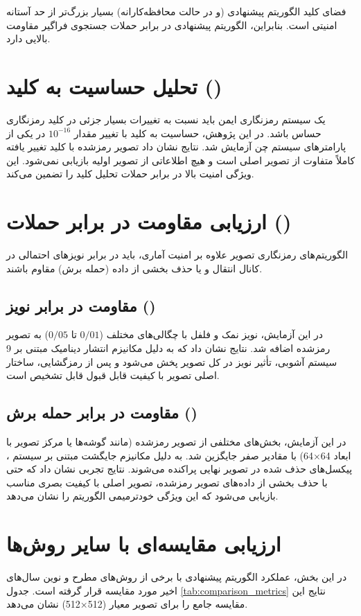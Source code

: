 فضای کلید الگوریتم پیشنهادی (و در حالت محافظه‌کارانه) بسیار بزرگ‌تر از حد آستانه امنیتی است. بنابراین، الگوریتم پیشنهادی در برابر حملات جستجوی فراگیر مقاومت بالایی دارد.

\section{تحلیل حساسیت به کلید ()}
یک سیستم رمزنگاری ایمن باید نسبت به تغییرات بسیار جزئی در کلید رمزنگاری حساس باشد. در این پژوهش، حساسیت به کلید با تغییر مقدار $10^{-16}$ در یکی از پارامترهای سیستم چن آزمایش شد. نتایج نشان داد تصویر رمزشده با کلید تغییر یافته کاملاً متفاوت از تصویر اصلی است و هیچ اطلاعاتی از تصویر اولیه بازیابی نمی‌شود. این ویژگی امنیت بالا در برابر حملات تحلیل کلید را تضمین می‌کند.

\section{ارزیابی مقاومت در برابر حملات ()}
الگوریتم‌های رمزنگاری تصویر علاوه بر امنیت آماری، باید در برابر نویزهای احتمالی در کانال انتقال و یا حذف بخشی از داده (حمله برش) مقاوم باشند.

\subsection{مقاومت در برابر نویز ()}
در این آزمایش، نویز نمک و فلفل با چگالی‌های مختلف ($0/01$ تا $0/05$) به تصویر رمزشده اضافه شد. نتایج نشان داد که به دلیل مکانیزم انتشار دینامیک مبتنی بر 9 سیستم آشوبی، تأثیر نویز در کل تصویر پخش می‌شود و پس از رمزگشایی، ساختار اصلی تصویر با کیفیت قابل قبول قابل تشخیص است.

\subsection{مقاومت در برابر حمله برش ()}
در این آزمایش، بخش‌های مختلفی از تصویر رمزشده (مانند گوشه‌ها یا مرکز تصویر با ابعاد 64×64) با مقادیر صفر جایگزین شد. به دلیل مکانیزم جایگشت مبتنی بر سیستم ، پیکسل‌های حذف شده در تصویر نهایی پراکنده می‌شوند. نتایج تجربی نشان داد که حتی با حذف بخشی از داده‌های تصویر رمزشده، تصویر اصلی با کیفیت بصری مناسب بازیابی می‌شود که این ویژگی خودترمیمی الگوریتم را نشان می‌دهد.

\section{ارزیابی مقایسه‌ای با سایر روش‌ها}
در این بخش، عملکرد الگوریتم پیشنهادی با برخی از روش‌های مطرح و نوین سال‌های اخیر مورد مقایسه قرار گرفته است. جدول \ref{tab:comparison_metrics} نتایج این مقایسه جامع را برای تصویر معیار  (512×512) نشان می‌دهد.

